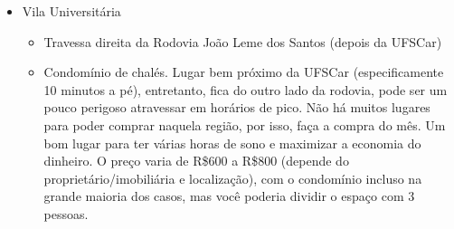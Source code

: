 \begin{itemize}
  \item Vila Universitária
    \begin{itemize}
      \item Travessa direita da Rodovia João Leme dos Santos (depois da UFSCar)
      \item Condomínio de chalés. Lugar bem próximo da UFSCar (especificamente 10 minutos a pé), entretanto, fica do outro lado da rodovia, pode ser um pouco perigoso atravessar em horários de pico. Não há muitos lugares para poder comprar naquela região, por isso, faça a compra do mês. Um bom lugar para ter várias horas de sono e maximizar a economia do dinheiro. O preço varia de R\$600 a R\$800 (depende do proprietário/imobiliária e localização), com o condomínio incluso na grande maioria dos casos, mas você poderia dividir o espaço com 3 pessoas.
    \end{itemize}


\end{itemize}
